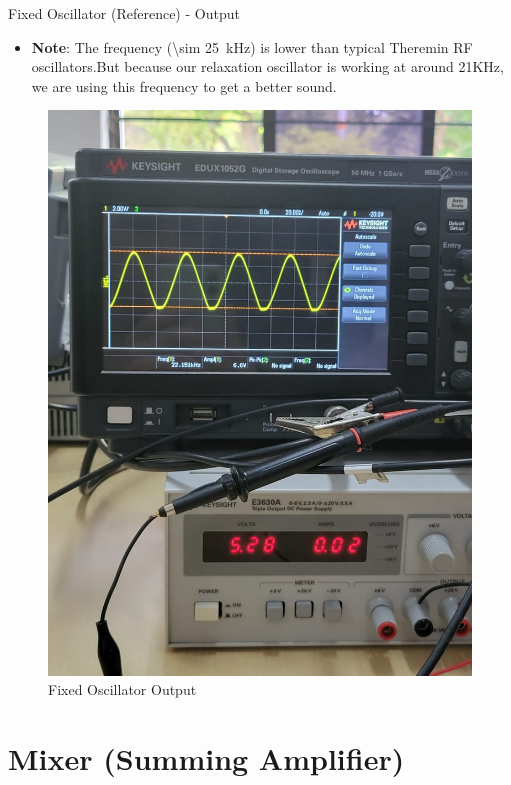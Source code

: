 \documentclass[10pt,xcolor={table,dvipsnames},t]{beamer}
\begin{document}
\begin{frame}{Fixed Oscillator (Reference) - Output}
\begin{itemize}
    \item \textbf{Note}: The frequency (\SI{\sim 25}{\kilo\hertz}) is lower than typical Theremin RF oscillators.But because our relaxation oscillator is working at around 21KHz, we are using this frequency to get a better sound.
\end{itemize}
\begin{figure}
    \centering
    \includegraphics[height=0.9 \textwidth]{fixed.jpeg}
    \caption{Fixed Oscillator Output}
    \label{fig:Fixed_Oscillator}
\end{figure}
\end{frame}

\section{Mixer (Summing Amplifier)}
\end{document}
